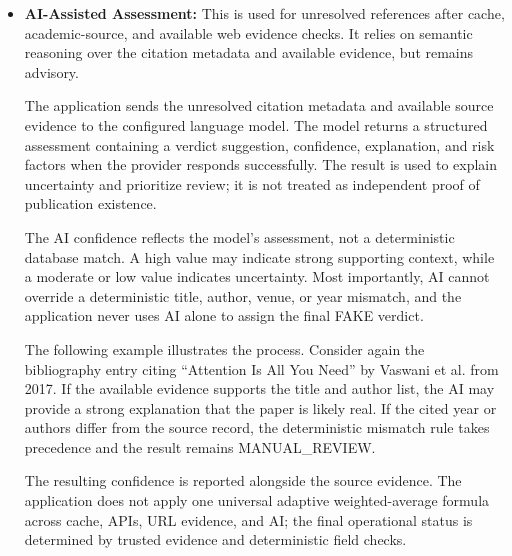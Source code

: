 \documentclass[12pt,a4paper,oneside]{report}
\begin{document}
\begin{itemize}
A weak web result does not terminate processing. The reference can proceed to AI-assisted assessment, but unresolved or inconsistent metadata remains MANUAL\_REVIEW.

The following example illustrates the process. Consider a bibliography entry citing the paper ``Attention Is All You Need'' by Vaswani et al., published in 2017, with the URL \url{https://arxiv.org/abs/1706.03762}. The system extracts the URL and inspects the visible page text for significant title keywords. If the page supports the cited title and authors, it strengthens the evidence; the reference is still checked against the remaining metadata and is routed to manual review if a substantive mismatch remains.

\item \textbf{AI-Assisted Assessment:} This is used for unresolved references after cache, academic-source, and available web evidence checks. It relies on semantic reasoning over the citation metadata and available evidence, but remains advisory.

The application sends the unresolved citation metadata and available source evidence to the configured language model. The model returns a structured assessment containing a verdict suggestion, confidence, explanation, and risk factors when the provider responds successfully. The result is used to explain uncertainty and prioritize review; it is not treated as independent proof of publication existence.

The AI confidence reflects the model's assessment, not a deterministic database match. A high value may indicate strong supporting context, while a moderate or low value indicates uncertainty. Most importantly, AI cannot override a deterministic title, author, venue, or year mismatch, and the application never uses AI alone to assign the final FAKE verdict.

The following example illustrates the process. Consider again the bibliography entry citing ``Attention Is All You Need'' by Vaswani et al. from 2017. If the available evidence supports the title and author list, the AI may provide a strong explanation that the paper is likely real. If the cited year or authors differ from the source record, the deterministic mismatch rule takes precedence and the result remains MANUAL\_REVIEW.

The resulting confidence is reported alongside the source evidence. The application does not apply one universal adaptive weighted-average formula across cache, APIs, URL evidence, and AI; the final operational status is determined by trusted evidence and deterministic field checks.
\end{itemize}
\end{document}
